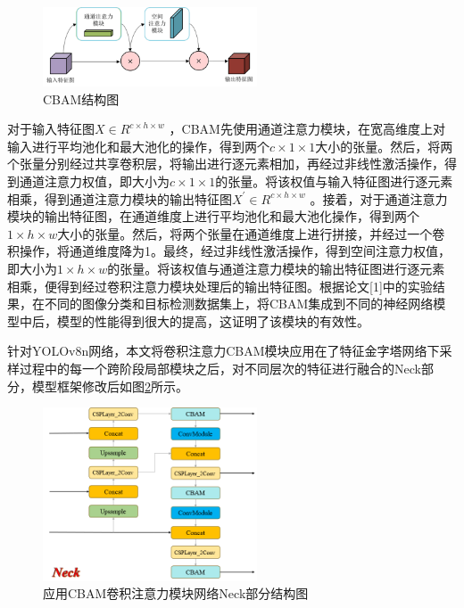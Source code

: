 \documentclass[journal]{IEEEtran}
\numberwithin{figure}{section}%
\numberwithin{table}{section}%
\numberwithin{equation}{section}
\begin{document}
\begin{figure}
  \centering
  \includegraphics[width=2.5in]{./figures/4_1.png}
  \caption{CBAM结构图}
  \label{fig:CBAM}
\end{figure}

对于输入特征图$X\in R^{c\times h\times w}$ ，CBAM先使用通道注意力模块，在宽高维度上对输入进行平均池化和最大池化的操作，得到两个$c\times1\times1$大小的张量。然后，将两个张量分别经过共享卷积层，将输出进行逐元素相加，再经过非线性激活操作，得到通道注意力权值，即大小为$c\times1\times1$的张量。将该权值与输入特征图进行逐元素相乘，得到通道注意力模块的输出特征图$X^{\prime}\in R^{c\times h\times w}$ 。接着，对于通道注意力模块的输出特征图，在通道维度上进行平均池化和最大池化操作，得到两个$1\times h\times w$大小的张量。然后，将两个张量在通道维度上进行拼接，并经过一个卷积操作，将通道维度降为1。最终，经过非线性激活操作，得到空间注意力权值，即大小为$1\times h\times w$的张量。将该权值与通道注意力模块的输出特征图进行逐元素相乘，便得到经过卷积注意力模块处理后的输出特征图。根据论文[1]中的实验结果，在不同的图像分类和目标检测数据集上，将CBAM集成到不同的神经网络模型中后，模型的性能得到很大的提高，这证明了该模块的有效性。\par

针对YOLOv8n网络，本文将卷积注意力CBAM模块应用在了特征金字塔网络下采样过程中的每一个跨阶段局部模块之后，对不同层次的特征进行融合的Neck部分，模型框架修改后如图\ref{fig:Neck}所示。\par

\begin{figure}
  \centering
  \includegraphics[width=2.5in]{./figures/4_2.png}
  \caption{应用CBAM卷积注意力模块网络Neck部分结构图}
  \label{fig:Neck}
\end{figure}
\end{document}
